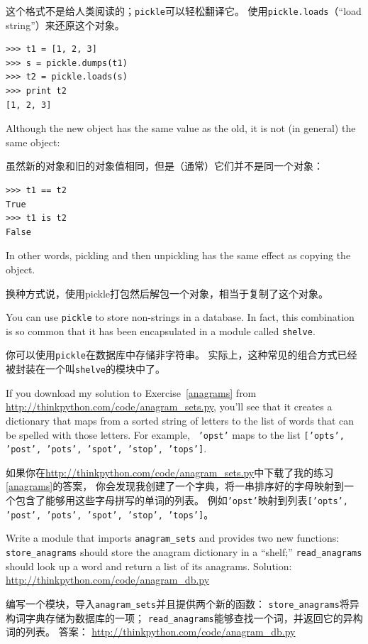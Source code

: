 \documentclass[10pt]{book}
\begin{document}
\begin{CJK}{UTF8}{gbsn}
这个格式不是给人类阅读的；{\tt pickle}可以轻松翻译它。
使用{\tt pickle.loads}（``load string''）来还原这个对象。

\begin{verbatim}
>>> t1 = [1, 2, 3]
>>> s = pickle.dumps(t1)
>>> t2 = pickle.loads(s)
>>> print t2
[1, 2, 3]
\end{verbatim}
%
Although the new object has the same value as the old, it is
not (in general) the same object:

虽然新的对象和旧的对象值相同，但是（通常）它们并不是同一个对象：

\begin{verbatim}
>>> t1 == t2
True
>>> t1 is t2
False
\end{verbatim}
%
In other words, pickling and then unpickling has the same effect
as copying the object.

换种方式说，使用pickle打包然后解包一个对象，相当于复制了这个对象。

You can use {\tt pickle} to store non-strings in a database.
In fact, this combination is so common that it has been
encapsulated in a module called {\tt shelve}.  

你可以使用{\tt pickle}在数据库中存储非字符串。
实际上，这种常见的组合方式已经被封装在一个叫{\tt shelve}的模块中了。

\begin{exercise}

If you download my solution to Exercise~\ref{anagrams} from
\url{http://thinkpython.com/code/anagram_sets.py}, you'll see that it creates
a dictionary that maps from a sorted string of letters to the list of
words that can be spelled with those letters.  For example, {\tt
  'opst'} maps to the list {\tt ['opts', 'post', 'pots', 'spot',
    'stop', 'tops']}.

如果你在\url{http://thinkpython.com/code/anagram_sets.py}中下载了我的练习\ref{anagrams}的答案，
你会发现我创建了一个字典，将一串排序好的字母映射到一个包含了能够用这些字母拼写的单词的列表。
例如{\tt 'opst'}映射到列表{\tt ['opts', 'post', 'pots', 'spot', 'stop', 'tops']}。


Write a module that imports \verb"anagram_sets" and provides
two new functions: \verb"store_anagrams" should store the
anagram dictionary in a ``shelf;'' \verb"read_anagrams" should
look up a word and return a list of its anagrams.
Solution: \url{http://thinkpython.com/code/anagram_db.py}

编写一个模块，导入\verb"anagram_sets"并且提供两个新的函数：
\verb"store_anagrams"将异构词字典存储为数据库的一项；
\verb"read_anagrams"能够查找一个词，并返回它的异构词的列表。
答案： \url{http://thinkpython.com/code/anagram_db.py}


\end{exercise}
\end{CJK}
\end{document}
